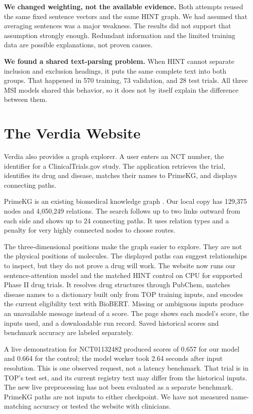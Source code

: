\documentclass[10pt,letterpaper]{article}
\begin{document}
\textbf{We changed weighting, not the available evidence.} Both attempts reused the same fixed sentence vectors and the same HINT graph. We had assumed that averaging sentences was a major weakness. The results did not support that assumption strongly enough. Redundant information and the limited training data are possible explanations, not proven causes.

\textbf{We found a shared text-parsing problem.} When HINT cannot separate inclusion and exclusion headings, it puts the same complete text into both groups. That happened in 570 training, 73 validation, and 28 test trials. All three MSI models shared this behavior, so it does not by itself explain the difference between them.

\section{The Verdia Website}
Verdia also provides a graph explorer. A user enters an NCT number, the identifier for a ClinicalTrials.gov study. The application retrieves the trial, identifies its drug and disease, matches their names to PrimeKG, and displays connecting paths.

PrimeKG is an existing biomedical knowledge graph \cite{primekg}. Our local copy has 129,375 nodes and 4,050,249 relations. The search follows up to two links outward from each side and shows up to 24 connecting paths. It uses relation types and a penalty for very highly connected nodes to choose routes.

The three-dimensional positions make the graph easier to explore. They are not the physical positions of molecules. The displayed paths can suggest relationships to inspect, but they do not prove a drug will work. The website now runs our sentence-attention model and the matched HINT control on CPU for supported Phase II drug trials. It resolves drug structures through PubChem, matches disease names to a dictionary built only from TOP training inputs, and encodes the current eligibility text with BioBERT. Missing or ambiguous inputs produce an unavailable message instead of a score. The page shows each model's score, the inputs used, and a downloadable run record. Saved historical scores and benchmark accuracy are labeled separately.

A live demonstration for NCT01132482 produced scores of 0.657 for our model and 0.664 for the control; the model worker took 2.64 seconds after input resolution. This is one observed request, not a latency benchmark. That trial is in TOP's test set, and its current registry text may differ from the historical inputs. The new live preprocessing has not been evaluated as a separate benchmark. PrimeKG paths are not inputs to either checkpoint. We have not measured name-matching accuracy or tested the website with clinicians.
\end{document}
